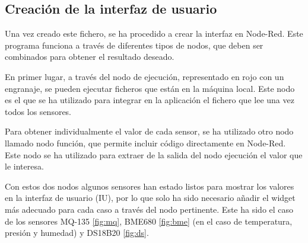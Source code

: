 \subsection{Creación de la interfaz de usuario}
Una vez creado este fichero, se ha procedido a crear la interfaz en Node-Red. Este programa funciona a través de diferentes tipos de nodos, que deben ser combinados para obtener el resultado deseado.

En primer lugar, a través del nodo de ejecución, representado en rojo con un engranaje, se pueden ejecutar ficheros que están en la máquina local. Este nodo es el que se ha utilizado para integrar en la aplicación el fichero que lee una vez todos los sensores.

Para obtener individualmente el valor de cada sensor, se ha utilizado otro nodo llamado nodo función, que permite incluir código directamente en Node-Red. Este nodo se ha utilizado para extraer de la salida del nodo ejecución el valor que le interesa.

Con estos dos nodos algunos sensores han estado listos para mostrar los valores en la interfaz de usuario (IU), por lo que solo ha sido necesario añadir el widget más adecuado para cada caso a través del nodo pertinente. Este ha sido el caso de los sensores MQ-135 \ref{fig:mq}, BME680 \ref{fig:bme} (en el caso de temperatura, presión y humedad) y DS18B20 \ref{fig:ds}.

